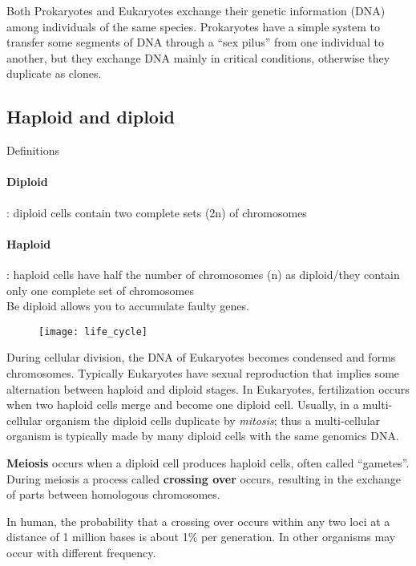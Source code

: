 Both Prokaryotes and Eukaryotes exchange their genetic information (DNA)
among individuals of the same species. Prokaryotes have a simple system to
transfer some segments of DNA through a ``sex pilus'' from one individual to
another, but they exchange DNA mainly in critical conditions, otherwise they
duplicate as clones.

\subsection{Haploid and diploid}

Definitions

\paragraph*{Diploid}: diploid cells contain two complete sets (2n) of
chromosomes

\paragraph*{Haploid}: haploid cells have half the number of chromosomes (n) as
diploid/they contain only one complete set of chromosomes \\


Be diploid allows you to accumulate faulty genes.

\begin{figure}[H]
  \centering
  \texttt{[image: life\_cycle]}
\end{figure}

During cellular division, the DNA of Eukaryotes becomes condensed and forms
chromosomes. Typically Eukaryotes have sexual reproduction that implies some
alternation between haploid and diploid stages. In Eukaryotes, fertilization
occurs when two haploid cells merge and become one diploid cell. Usually, in a
multi-cellular organism the diploid cells duplicate by \textit{mitosis}; thus a
multi-cellular organism is typically made by many diploid cells with the same
genomics DNA.

\textbf{Meiosis} occurs when a diploid cell produces haploid cells, often
called ``gametes''. During meiosis a process called \textbf{crossing over}
occurs, resulting in the exchange of parts between homologous chromosomes.

In human, the probability that a crossing over occurs within any two loci at
a distance of 1 million bases is about 1\% per generation.
In other organisms may occur with different frequency.

